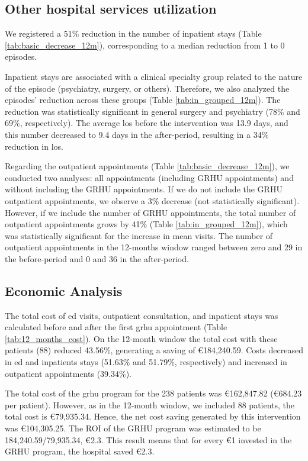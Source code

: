 \documentclass{bmcart}
\begin{document}
\subsection*{Other hospital services utilization}
We registered a 51\% reduction in the number of inpatient stays (Table \ref{tab:basic_decrease_12m}), corresponding to a median reduction from 1 to 0 episodes. 
\par Inpatient stays are associated with a clinical specialty group related to the nature of the episode (\eg psychiatry, surgery, or others).
Therefore, we also analyzed the episodes' reduction across these groups (Table \ref{tab:in_grouped_12m}). The reduction was statistically significant in general surgery and psychiatry (78\% and 69\%, respectively).
The average \gls{los} before the intervention was 13.9 days, and this number decreased to 9.4 days in the after-period, resulting in a 34\% reduction in \gls{los}.
\par Regarding the outpatient appointments (Table \ref{tab:basic_decrease_12m}), we conducted two analyses:  all appointments (including GRHU appointments) and without including the GRHU appointments. 
If we do not include the GRHU outpatient appointments, we observe a 3\% decrease (not statistically significant).
However, if we include the number of GRHU appointments, the total number of outpatient appointments grows by 41\% (Table \ref{tab:in_grouped_12m}), which was statistically significant for the increase in mean visits.
The number of outpatient appointments in the 12-months window ranged between zero and 29 in the before-period and 0 and 36 in the after-period. 


\subsection*{Economic Analysis}
\par The total cost of \gls{ed} visits, outpatient consultation, and inpatient stays was calculated before and after the first \gls{grhu} appointment (Table  \ref{tab:12_months_cost}). On the 12-month window the total cost with these patients (88) reduced 43.56\%, generating a saving of €184,240.59. Costs decreased in \gls{ed} and inpatients stays (51.63\% and 51.79\%, respectively) and increased in outpatient appointments (39.34\%). 
\par The total cost of the \gls{grhu} program for the 238 patients was €162,847.82 (€684.23 per patient). However, as in the 12-month window, we included 88 patients, the total cost is €79,935.34. Hence, the net cost saving generated by this intervention was €104,305.25. The ROI of the GRHU program was estimated to be 184,240.59/79,935.34, €2.3. This result means that for every €1 invested in the GRHU program, the hospital saved €2.3.  
\end{document}
